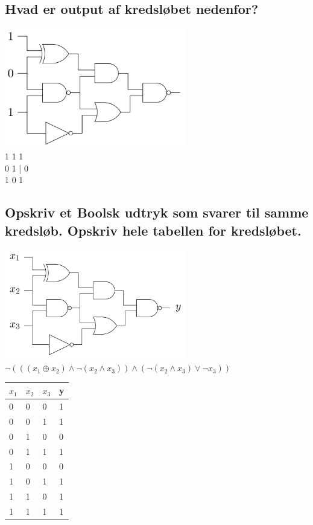 \documentclass[12pt, a4paper]{article}
\begin{document}
					\subsection{Hvad er output af kredsløbet nedenfor?}
						\includegraphics[width=300px]{images/38.1.2.png}\\
						1 1 1\\
						0 1 | 0\\
						1 0 1
					\subsection{Opskriv et Boolsk udtryk som svarer til samme kredsløb. Opskriv hele tabellen for kredsløbet.}
						\includegraphics[width=300px]{images/38.1.3.png}\\
						$\neg(((x_1\oplus x_2) \land \neg(x_2\land x_3))\land(\neg(x_2\land x_3)\lor \neg x_3))$

						\begin{table}[h!]
						\begin{tabular}{|l|l|l|l|}
						\hline	
						$x_1$  & $x_2$  & $x_3$  & y \\ \hline
						0    & 0    & 0    & 1 \\ \hline
						0    & 0    & 1    & 1 \\ \hline
						0    & 1    & 0    & 0 \\ \hline
						0    & 1    & 1    & 1 \\ \hline
						1    & 0    & 0    & 0 \\ \hline
						1    & 0    & 1    & 1 \\ \hline
						1    & 1    & 0    & 1 \\ \hline
						1    & 1    & 1    & 1 \\ \hline
						\end{tabular}
						\end{table}
\end{document}
